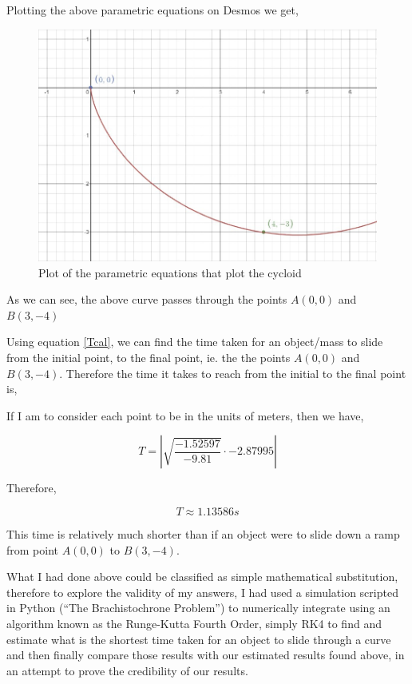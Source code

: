 {Plotting the above parametric equations on Desmos we get,}

\begin{figure}[H]
\centering
\includegraphics[width=15cm]{cycplt.jpg}
    		\caption{{Plot of the parametric equations that plot the cycloid}}
\end{figure}

{As we can see, the above curve passes through the points $A(0,0)$ and $B(3,-4)$}

{Using equation \ref{Tcal}, we can find the time taken for an object/mass to slide from the initial point, to the final point, ie. the the points $A(0,0)$ and $B(3,-4)$. Therefore the time it takes to reach from the initial to the final point is,}

{If I am to consider each point to be in the units of meters, then we have,}

	$$T = \left|\sqrt{\frac{-1.52597}{-9.81}}\cdot -2.87995\right|$$

{Therefore,}

	$$T \approx 1.13586 s$$

{This time is relatively much shorter than if an object were to slide down a ramp from point $A(0,0)$ to $B(3,-4)$.}


{What I had done above could be classified as simple mathematical substitution, therefore to explore the validity of my answers, I had used a simulation scripted in Python (“The Brachistochrone Problem”) to numerically integrate using an algorithm known as the Runge-Kutta Fourth Order, simply RK4 to find and estimate what is the shortest time taken for an object to slide through a curve and then finally compare those results with our estimated results found above, in an attempt to prove the credibility of our results.}


